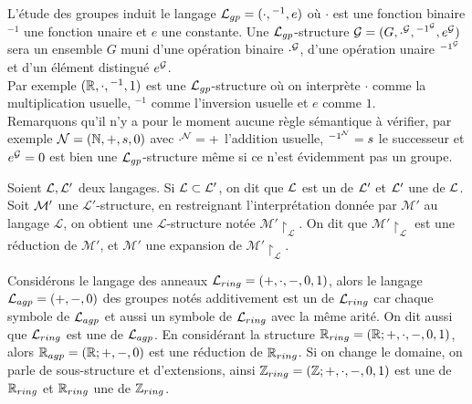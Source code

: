 \begin{exem}
L'étude des groupes induit le langage $\mathcal{L}_{gp} =
(\cdot,{}^{-1},e)$ où $\cdot$ est une fonction binaire ${}^{-1}$ une fonction unaire et $e$ une constante.
Une $\mathcal{L}_{gp}$-structure $\mathcal{G} = (G,\cdot^{\mathcal{G}},{}^{{-1}^{\mathcal{G}}},e^{\mathcal{G}})$ sera un ensemble $G$
muni d'une opération binaire $\cdot^{\mathcal{G}}$, d'une opération unaire
${}^{{-1}^{\mathcal{G}}}$ et d'un élément distingué $e^{\mathcal{G}}$. \\
Par exemple $(\mathbb{R},\cdot,{}^{-1},1)$ est une $\mathcal{L}_{gp}$-structure où on interprète
$\cdot$ comme la multiplication usuelle, ${}^{-1}$ comme l'inversion usuelle et
$e$ comme $1$.  \\
Remarquons qu'il n'y a pour le moment aucune règle
sémantique à vérifier, par exemple $\mathcal{N} = (\mathbb{N},+,s,0)$ avec $\cdot^{\mathcal{N}} = +$ l'addition usuelle, ${}^{{-1}^{\mathcal{N}}}
= s$ le successeur et $e^{\mathcal{G}} = 0$ est bien une
$\mathcal{L}_{gp}$-structure même si ce n'est évidemment pas un groupe.
\end{exem}

\begin{defi}
Soient $\mathcal{L},\mathcal{L}'$ deux langages. Si $\mathcal{L} \subset \mathcal{L}'$, on dit que $\mathcal{L}$ est
un  de $\mathcal{L}'$ et $\mathcal{L}'$ une  de $\mathcal{L}$.
Soit $\mathcal{M}'$ une $\mathcal{L'}$-structure, en restreignant l’interprétation donnée par $\mathcal{M'}$ au langage $\mathcal{L}$,
on obtient une $\mathcal{L}$-structure notée $\mathcal{M}'\upharpoonright_{\mathcal{L}}$. On dit que $\mathcal{M}'\upharpoonright_{\mathcal{L}}$
est une réduction de $\mathcal{M}'$, et $\mathcal{M}'$ une expansion de $\mathcal{M}'\upharpoonright_{\mathcal{L}}$.
\end{defi}

\begin{exem}
Considérons le langage des anneaux $\mathcal{L}_{ring} =
(+,\cdot, - , 0 ,1 ) $, alors le langage $\mathcal{L}_{agp} = (+,-,0 )$ des groupes
notés additivement est un  de $\mathcal{L}_{ring}$ car chaque symbole de
$\mathcal{L}_{agp}$ et aussi un symbole de $\mathcal{L}_{ring}$ avec la même arité. On dit aussi
que $\mathcal{L}_{ring}$ est une  de $\mathcal{L}_{agp}$. En considérant la structure
$\mathbb{R}_{ring} = (\mathbb{R};+,\cdot, - , 0 ,1 )$, alors $\mathbb{R}_{agp} = (\mathbb{R};+,-,0)$ est
une réduction de $\mathbb{R}_{ring}$. Si on change le domaine, on parle de
sous-structure et d'extensions, ainsi $\mathbb{Z}_{ring} = (\mathbb{Z};+,\cdot, - , 0 ,1 )$
est une  de $\mathbb{R}_{ring}$ et $\mathbb{R}_{ring}$ une  de
$\mathbb{Z}_{ring}$.
\end{exem}

